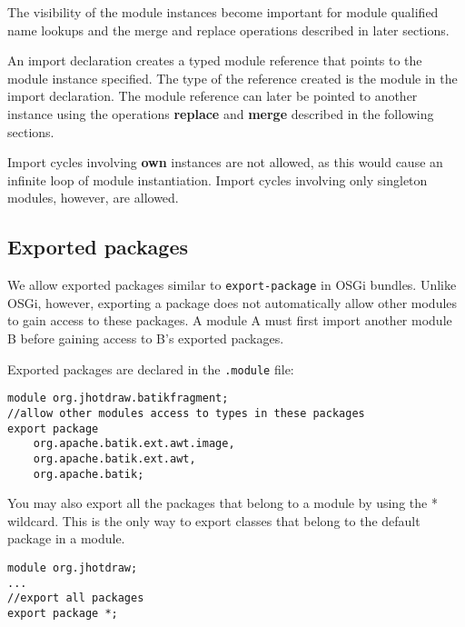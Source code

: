 The visibility of the module instances become important for module
qualified name lookups and the merge and replace operations described in later
sections.

An import declaration creates a typed module reference that points to the module
instance specified. The type of the reference created is the module
in the import declaration. The module reference can later be pointed to another
instance using the operations \textbf{replace} and \textbf{merge} described
in the following sections.

Import cycles involving \textbf{own} instances are not allowed, as this would 
cause an infinite loop of module instantiation. Import cycles involving only
singleton modules, however, are allowed.

\subsection{Exported packages}

We allow exported packages similar to {\tt export-package} in OSGi bundles. Unlike OSGi, however,
exporting a package does not automatically allow other modules to gain
access to these packages. A module A must first import another module B
before gaining access to B's exported packages.

Exported packages are declared in the {\tt .module} file:

\begin{lstlisting}
module org.jhotdraw.batikfragment;
//allow other modules access to types in these packages
export package 
	org.apache.batik.ext.awt.image,
	org.apache.batik.ext.awt,
	org.apache.batik;
\end{lstlisting}

You may also export all the packages that belong to a module by using
the * wildcard. This is the only way to export classes that belong to
the default package in a module.

\begin{lstlisting}
module org.jhotdraw;
...
//export all packages
export package *;
\end{lstlisting}




